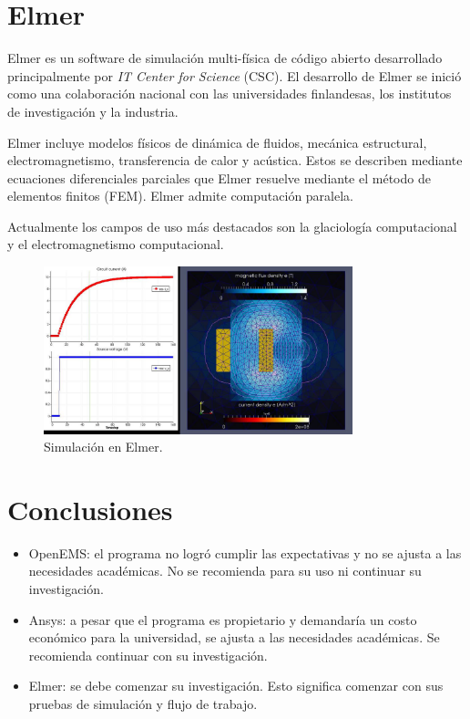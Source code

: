 \documentclass[
    11pt,
    spanish,
    a4paper
]{article}
\begin{document}
\newpage


\section{Elmer}

Elmer es un software de simulación multi-física de código abierto desarrollado principalmente por \emph{IT Center for Science} (CSC).
El desarrollo de Elmer se inició como una colaboración nacional con las universidades finlandesas, los institutos de investigación y la industria.

Elmer incluye modelos físicos de dinámica de fluidos, mecánica estructural, electromagnetismo, transferencia de calor y acústica.
Estos se describen mediante ecuaciones diferenciales parciales que Elmer resuelve mediante el método de elementos finitos (FEM).
Elmer admite computación paralela.

Actualmente los campos de uso más destacados son la glaciología computacional y el electromagnetismo computacional.

\begin{figure}[htbp]
	\centering
	\includegraphics[width=0.8\textwidth]{img/elmer.jpg}
	\caption{Simulación en Elmer.}
	\label{fig:elmer}
\end{figure}

\newpage

\section{Conclusiones}

\begin{itemize}
	\item OpenEMS: el programa no logró cumplir las expectativas y no se ajusta a las necesidades académicas. No se recomienda para su uso ni continuar su investigación.
	\item Ansys: a pesar que el programa es propietario y demandaría un costo económico para la universidad, se ajusta a las necesidades académicas. Se recomienda continuar con su investigación.
	\item Elmer: se debe comenzar su investigación. Esto significa comenzar con sus pruebas de simulación y flujo de trabajo.
\end{itemize}
\end{document}
